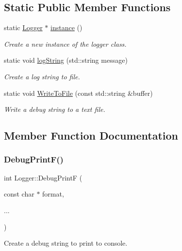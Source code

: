 \subsection*{Static Public Member Functions}
\begin{DoxyCompactItemize}
\item 
static \hyperlink{class_logger}{Logger} $\ast$ \hyperlink{class_logger_a9f9acae64a5f26267526d16196ea23c8}{instance} ()
\begin{DoxyCompactList}\small\item\em Create a new instance of the logger class. \end{DoxyCompactList}\item 
static void \hyperlink{class_logger_a60a7e18908cf2d21da346388cadba499}{log\+String} (std\+::string message)
\begin{DoxyCompactList}\small\item\em Create a log string to file. \end{DoxyCompactList}\item 
static void \hyperlink{class_logger_ae39ca8ff81f01cf03b1809cdaaa6bf14}{Write\+To\+File} (const std\+::string \&buffer)
\begin{DoxyCompactList}\small\item\em Write a debug string to a text file. \end{DoxyCompactList}\end{DoxyCompactItemize}


\subsection{Member Function Documentation}
\mbox{\label{class_logger_ab707ab9f31be1d73dda88e4f4f83bca0}} 
\subsubsection{\texorpdfstring{Debug\+Print\+F()}{DebugPrintF()}}
{\footnotesize\ttfamily int Logger\+::\+Debug\+PrintF (\begin{DoxyParamCaption}\item[{const char $\ast$}]{format,  }\item[{}]{... }\end{DoxyParamCaption})}



Create a debug string to print to console. 



